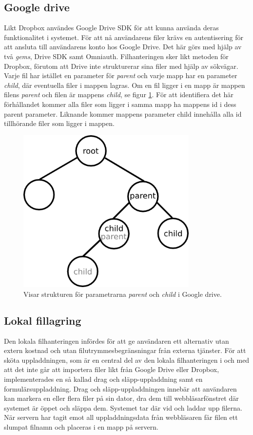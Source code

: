 \subsection{Google drive}
Likt Dropbox användes Google Drive SDK för att kunna använda deras funktionalitet i systemet. För att nå användarens filer krävs en autentisering för att ansluta till användarens konto hos Google Drive. Det här görs med hjälp av två \textit{gems}, Drive SDK samt Omniauth. Filhanteringen sker likt metoden för Dropbox, förutom att Drive inte strukturerar sina filer med hjälp av sökvägar. Varje fil har istället en parameter för \textit{parent} och varje mapp har en parameter \textit{child}, där eventuella filer i mappen lagras. Om en fil ligger i en mapp är mappen filens \textit{parent} och filen är mappens \textit{child}, se figur \ref{fig:parentchild}. För att identifiera det här förhållandet kommer alla filer som ligger i samma mapp ha mappens id i dess parent parameter. Liknande kommer mappens parameter child innehålla alla id tillhörande filer som ligger i mappen.

\begin{figure}[!H]
\centering
\includegraphics[width=0.8\textwidth]{figures/pcarent2.png}
\caption{Visar strukturen för parametrarna \textit{parent} och \textit{child} i Google drive.}
\label{fig:parentchild}
\end{figure}

\subsection{Lokal fillagring} \label{sec:local}
Den lokala filhanteringen infördes för att ge användaren ett alternativ utan extern kostnad och utan filutrymmesbegränsningar från externa tjänster. För att sköta uppladdningen, som är en central del av den lokala filhanteringen i och med att det inte går att importera filer likt från Google Drive eller Dropbox, implementerades en så kallad drag och släpp-uppladdning samt en formulärsuppladdning. Drag och släpp-uppladdningen innebär att användaren kan markera en eller flera filer på sin dator, dra dem till webbläsarfönstret där systemet är öppet och släppa dem. Systemet tar där vid och laddar upp filerna. När servern har tagit emot all uppladdningsdata från webbläsaren får filen ett slumpat filnamn och placeras i en mapp på servern.

